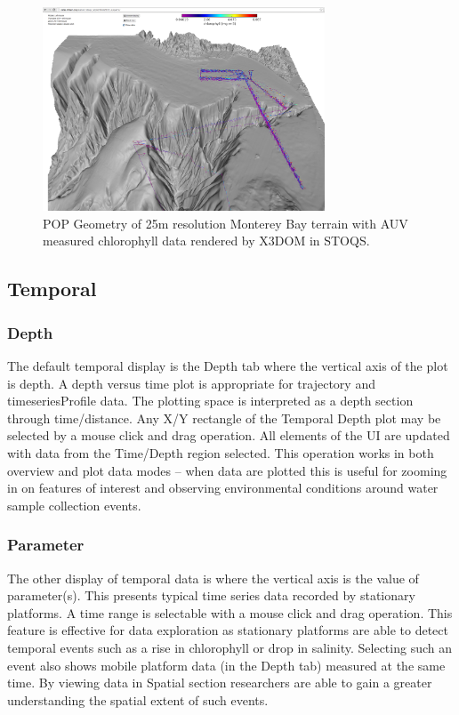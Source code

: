 \documentclass[conference]{IEEEtran}
\begin{document}
\begin{figure}[htbp]
\centering
\includegraphics[width=3.3in]{Monterey25_lrauvs.png}
\caption{POP Geometry of 25m resolution Monterey Bay terrain with AUV measured chlorophyll data rendered by X3DOM in STOQS.}
\label{fig:Monterey25_lrauvs}
\end{figure}


\subsection{Temporal}

\subsubsection{Depth}
The default temporal display is the Depth tab where the vertical axis of the plot is depth. A depth versus time plot is appropriate for trajectory and timeseriesProfile data. The plotting space is interpreted as a depth section through time/distance. Any X/Y rectangle of the Temporal Depth plot may be selected by a mouse click and drag operation. All elements of the UI are updated with data from the Time/Depth region selected. This operation works in both overview and plot data modes -- when data are plotted this is useful for zooming in on features of interest and observing environmental conditions around water sample collection events.

\subsubsection{Parameter}
The other display of temporal data is where the vertical axis is the value of parameter(s). This presents typical time series data recorded by stationary platforms. A time range is selectable with a mouse click and drag operation. This feature is effective for data exploration as stationary platforms are able to detect temporal events such as a rise in chlorophyll or drop in salinity. Selecting such an event also shows mobile platform data (in the Depth tab) measured at the same time. By viewing data in Spatial section researchers are able to gain a greater understanding the spatial extent of such events.
\end{document}
